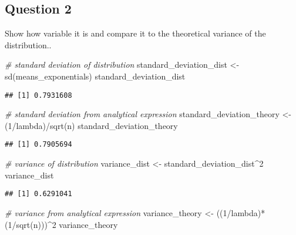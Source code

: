 \documentclass[
]{article}
\newenvironment{Shaded}{\begin{snugshade}}{\end{snugshade}}
\newcommand{\CommentTok}[1]{\textcolor[rgb]{0.56,0.35,0.01}{\textit{#1}}}
\newcommand{\DecValTok}[1]{\textcolor[rgb]{0.00,0.00,0.81}{#1}}
\newcommand{\FunctionTok}[1]{\textcolor[rgb]{0.00,0.00,0.00}{#1}}
\newcommand{\NormalTok}[1]{#1}
\newcommand{\OtherTok}[1]{\textcolor[rgb]{0.56,0.35,0.01}{#1}}
\newcommand{\SpecialCharTok}[1]{\textcolor[rgb]{0.00,0.00,0.00}{#1}}
\begin{document}
\hypertarget{question-2}{%
\subsection{Question 2}\label{question-2}}

Show how variable it is and compare it to the theoretical variance of
the distribution..

\begin{Shaded}
\begin{Highlighting}[]
\CommentTok{\# standard deviation of distribution}
\NormalTok{standard\_deviation\_dist }\OtherTok{\textless{}{-}} \FunctionTok{sd}\NormalTok{(means\_exponentials)}
\NormalTok{standard\_deviation\_dist}
\end{Highlighting}
\end{Shaded}

\begin{verbatim}
## [1] 0.7931608
\end{verbatim}

\begin{Shaded}
\begin{Highlighting}[]
\CommentTok{\# standard deviation from analytical expression}
\NormalTok{standard\_deviation\_theory }\OtherTok{\textless{}{-}}\NormalTok{ (}\DecValTok{1}\SpecialCharTok{/}\NormalTok{lambda)}\SpecialCharTok{/}\FunctionTok{sqrt}\NormalTok{(n)}
\NormalTok{standard\_deviation\_theory}
\end{Highlighting}
\end{Shaded}

\begin{verbatim}
## [1] 0.7905694
\end{verbatim}

\begin{Shaded}
\begin{Highlighting}[]
\CommentTok{\# variance of distribution}
\NormalTok{variance\_dist }\OtherTok{\textless{}{-}}\NormalTok{ standard\_deviation\_dist}\SpecialCharTok{\^{}}\DecValTok{2}
\NormalTok{variance\_dist}
\end{Highlighting}
\end{Shaded}

\begin{verbatim}
## [1] 0.6291041
\end{verbatim}

\begin{Shaded}
\begin{Highlighting}[]
\CommentTok{\# variance from analytical expression}
\NormalTok{variance\_theory }\OtherTok{\textless{}{-}}\NormalTok{ ((}\DecValTok{1}\SpecialCharTok{/}\NormalTok{lambda)}\SpecialCharTok{*}\NormalTok{(}\DecValTok{1}\SpecialCharTok{/}\FunctionTok{sqrt}\NormalTok{(n)))}\SpecialCharTok{\^{}}\DecValTok{2}
\NormalTok{variance\_theory}
\end{Highlighting}
\end{Shaded}
\end{document}
